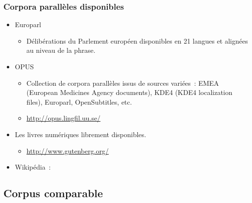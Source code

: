 \begin{frame}
\frametitle{Corpora parallèles disponibles}

\begin{itemize}\itemsep10pt
    \item Europarl~\cite{koehn2005europarl}
    \begin{itemize}
        \item Délibérations du Parlement européen disponibles en 21 langues et 
              alignées au niveau de la phrase.
    \end{itemize}
    \item OPUS~\cite{tiedemann2009news}
    \begin{itemize}
        \item Collection de corpora parallèles issus de sources variées~:
              EMEA (European Medicines Agency documents), KDE4 (KDE4 
              localization files), Europarl, OpenSubtitles, etc.
        \item \url{http://opus.lingfil.uu.se/}
    \end{itemize}
    \item Les livres numériques librement disponibles.
    \begin{itemize}
        \item \url{http://www.gutenberg.org/}
    \end{itemize}
    \item Wikipédia~: \alert{}
\end{itemize}

\end{frame}


\subsection{Corpus comparable}


